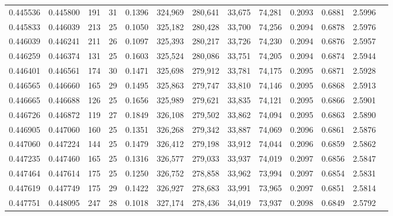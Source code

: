 \begin{tabular}{rrrrrrrrrrrrr}
0.445536 & 0.445800 &    191 &    31 &                                     0.1396 & 324,969 & 280,641 &  33,675 &  74,281 & 0.2093 & 0.6881 & 2.5996 \\
0.445833 & 0.446039 &    213 &    25 &                                     0.1050 & 325,182 & 280,428 &  33,700 &  74,256 & 0.2094 & 0.6878 & 2.5976 \\
0.446039 & 0.446241 &    211 &    26 &                                     0.1097 & 325,393 & 280,217 &  33,726 &  74,230 & 0.2094 & 0.6876 & 2.5957 \\
0.446259 & 0.446374 &    131 &    25 &                                     0.1603 & 325,524 & 280,086 &  33,751 &  74,205 & 0.2094 & 0.6874 & 2.5944 \\
0.446401 & 0.446561 &    174 &    30 &                                     0.1471 & 325,698 & 279,912 &  33,781 &  74,175 & 0.2095 & 0.6871 & 2.5928 \\
0.446565 & 0.446660 &    165 &    29 &                                     0.1495 & 325,863 & 279,747 &  33,810 &  74,146 & 0.2095 & 0.6868 & 2.5913 \\
0.446665 & 0.446688 &    126 &    25 &                                     0.1656 & 325,989 & 279,621 &  33,835 &  74,121 & 0.2095 & 0.6866 & 2.5901 \\
0.446726 & 0.446872 &    119 &    27 &                                     0.1849 & 326,108 & 279,502 &  33,862 &  74,094 & 0.2095 & 0.6863 & 2.5890 \\
0.446905 & 0.447060 &    160 &    25 &                                     0.1351 & 326,268 & 279,342 &  33,887 &  74,069 & 0.2096 & 0.6861 & 2.5876 \\
0.447060 & 0.447224 &    144 &    25 &                                     0.1479 & 326,412 & 279,198 &  33,912 &  74,044 & 0.2096 & 0.6859 & 2.5862 \\
0.447235 & 0.447460 &    165 &    25 &                                     0.1316 & 326,577 & 279,033 &  33,937 &  74,019 & 0.2097 & 0.6856 & 2.5847 \\
0.447464 & 0.447614 &    175 &    25 &                                     0.1250 & 326,752 & 278,858 &  33,962 &  73,994 & 0.2097 & 0.6854 & 2.5831 \\
0.447619 & 0.447749 &    175 &    29 &                                     0.1422 & 326,927 & 278,683 &  33,991 &  73,965 & 0.2097 & 0.6851 & 2.5814 \\
0.447751 & 0.448095 &    247 &    28 &                                     0.1018 & 327,174 & 278,436 &  34,019 &  73,937 & 0.2098 & 0.6849 & 2.5792 \\

\end{tabular}
